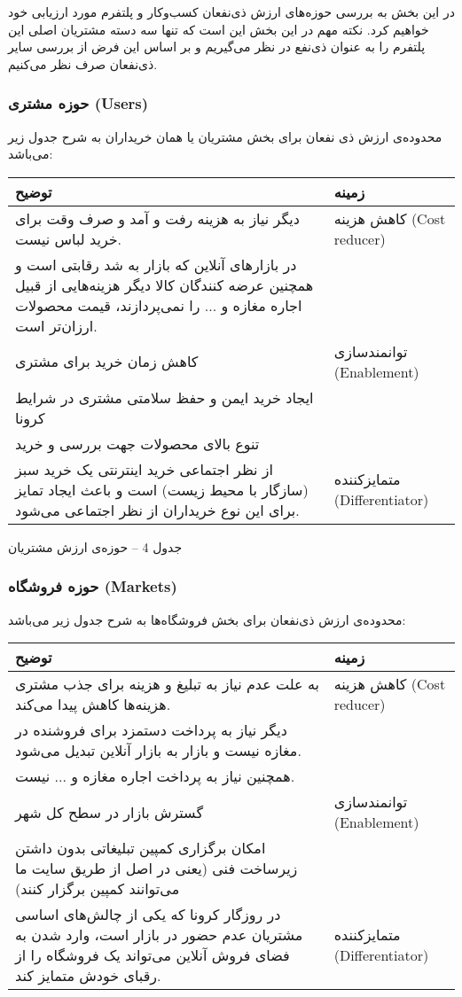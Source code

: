 \documentclass[]{article}
\begin{document}
در این بخش به بررسی حوزه‌های ارزش ذی‌نفعان کسب‌وکار و پلتفرم مورد
ارزیابی خود خواهیم کرد. نکته مهم در این بخش این است که تنها سه دسته
مشتریان اصلی این پلتفرم را به عنوان ذی‌نفع در نظر می‌گیریم و بر اساس این
فرض از بررسی سایر ذی‌نفعان صرف نظر می‌کنیم.

\subsubsection{حوزه مشتری
(Users)}\label{ux62dux648ux632ux647-ux645ux634ux62aux631ux6cc-users}

محدوده‌ی ارزش ذی نفعان برای بخش مشتریان یا همان خریداران به شرح جدول زیر
می‌باشد:

\begin{longtable}[]{@{}ll@{}}
\toprule
توضیح & زمینه\tabularnewline
\midrule
\endhead
دیگر نیاز به هزینه رفت و آمد و صرف وقت برای خرید لباس نیست. & کاهش هزینه
(Cost reducer)\tabularnewline
در بازارهای آنلاین که بازار به شد رقابتی است و همچنین عرضه کنندگان کالا
دیگر هزینه‌هایی از قبیل اجاره مغازه و ... را نمی‌پردازند، قیمت محصولات
ارزان‌تر است. &\tabularnewline
کاهش زمان خرید برای مشتری & توانمندسازی (Enablement)\tabularnewline
ایجاد خرید ایمن و حفظ سلامتی مشتری در شرایط کرونا &\tabularnewline
تنوع بالای محصولات جهت بررسی و خرید &\tabularnewline
از نظر اجتماعی خرید اینترنتی یک خرید سبز (سازگار با محیط زیست) است و
باعث ایجاد تمایز برای این نوع خریداران از نظر اجتماعی می‌شود. &
متمایزکننده (Differentiator)\tabularnewline
\bottomrule
\end{longtable}

جدول 4 -- حوزه‌ی ارزش مشتریان

\subsubsection{حوزه فروشگاه
(Markets)}\label{ux62dux648ux632ux647-ux641ux631ux648ux634ux6afux627ux647-markets}

محدوده‌ی ارزش ذی‌نفعان برای بخش فروشگاه‌ها به شرح جدول زیر می‌باشد:

\begin{longtable}[]{@{}ll@{}}
\toprule
توضیح & زمینه\tabularnewline
\midrule
\endhead
به علت عدم نیاز به تبلیغ و هزینه برای جذب مشتری هزینه‌ها کاهش پیدا
می‌کند. & کاهش هزینه (Cost reducer)\tabularnewline
دیگر نیاز به پرداخت دستمزد برای فروشنده در مغازه نیست و بازار به بازار
آنلاین تبدیل می‌شود. &\tabularnewline
همچنین نیاز به پرداخت اجاره مغازه و ... نیست. &\tabularnewline
گسترش بازار در سطح کل شهر & توانمندسازی (Enablement)\tabularnewline
امکان برگزاری کمپین تبلیغاتی بدون داشتن زیرساخت فنی (یعنی در اصل از طریق
سایت ما می‌توانند کمپین برگزار کنند) &\tabularnewline
در روزگار کرونا که یکی از چالش‌های اساسی مشتریان عدم حضور در بازار است،
وارد شدن به فضای فروش آنلاین می‌تواند یک فروشگاه را از رقبای خودش متمایز
کند. & متمایزکننده (Differentiator)\tabularnewline
\bottomrule
\end{longtable}
\end{document}
